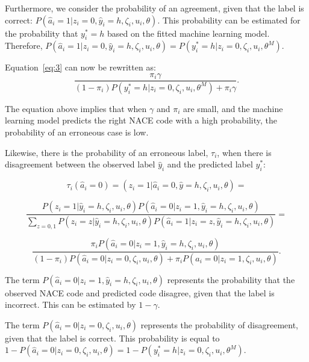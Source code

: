 \documentclass[12pt, a4paper, titlepage]{article}
\begin{document}
Furthermore, we consider the probability of an agreement, given that the label is correct: $P(\hat{a}_i=1|z_i=0, \hat{y}_i = h, \zeta_i, u_i, \theta)$. This probability can be estimated for the probability that $y^*_i = h$ based on the fitted machine learning model. Therefore, $P(\hat{a}_i=1|z_i=0, \hat{y}_i = h, \zeta_i, u_i, \theta) = P(y^*_i = h | z_i = 0, \zeta_i, u_i, \theta^M)$. 


Equation~\ref{eq:3} can now be rewritten as:
						\begin{equation}\label{eq:6}
\frac{\pi_i \gamma}{(1-\pi_i)P(y^*_i = h | z_i = 0, \zeta_i, u_i, \theta^M) + \pi_i \gamma  }.
						\end{equation}

The equation above implies that when $\gamma$ and $\pi_i$ are small, and the machine learning model predicts the right NACE code with a high probability, the probability of an erroneous case is low.

Likewise, there is the probability of an erroneous label, $\tau_i$, when there is disagreement between the observed label $\hat{y}_i$ and the predicted label $y^*_i$:

						\begin{equation}\label{eq:7}
\tau_i(\hat{a}_i = 0) = (z_i = 1 | \hat{a}_i = 0, \hat{y} = h, \zeta_i, u_i, \theta) = 
						\end{equation}

						\begin{equation}\label{eq:8}
\frac{P(z_i = 1|\hat{y}_i = h, \zeta_i, u_i, \theta) P(\hat{a}_i=0|z_i=1, \hat{y}_i = h, \zeta_i, u_i, \theta) }
{\sum_{z=0,1}P(z_i=z|\hat{y}_i = h, \zeta_i, u_i, \theta) P( \hat{a}_i=1|z_i=z, \hat{y}_i = h, \zeta_i, u_i, \theta  )} =
						\end{equation}

						\begin{equation}\label{eq:9}
\frac{\pi_i P(\hat{a}_i=0|z_i=1, \hat{y}_i = h, \zeta_i, u_i, \theta) }
{(1-\pi_i)P(\hat{a}_i = 0 | z_i = 0, \zeta_i, u_i, \theta) + \pi_i P(\hat{a}_i = 0 | z_i = 1, \zeta_i, u_i, \theta) } .
						\end{equation}

The term $P(\hat{a}_i= 0|z_i = 1, \hat{y}_i = h, \zeta_i, u_i, \theta)$ represents the probability that the observed NACE code and predicted code disagree, given that the label is incorrect. This can be estimated by $1-\gamma$.

The term $P(\hat{a}_i = 0 | z_i = 0, \zeta_i, u_i, \theta)$ represents the probability of disagreement, given that the label is correct. This probability is equal to $1 - P(\hat{a}_i = 0 | z_i = 0, \zeta_i, u_i, \theta) = 1 - P(y^*_i = h | z_i = 0, \zeta_i, u_i, \theta^M)$. 
\end{document}

